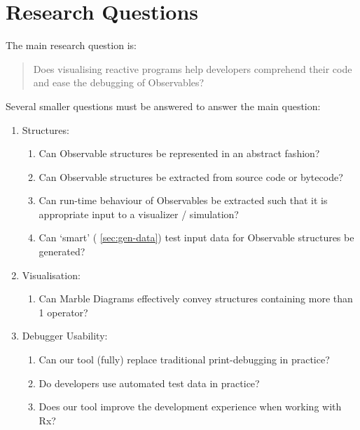 \section{Research Questions}%
\label{sec:questions} The main research question is:

\begin{quotation}
    \noindent
    Does visualising reactive programs help developers comprehend their
    code and ease the debugging of Observables?
\end{quotation}

\noindent
Several smaller questions must be answered to answer the main question:

\begin{enumerate}
    \item
        Structures:
        \begin{enumerate}
            \item
                Can Observable structures be represented in an abstract
                fashion?
            \item
                Can Observable structures be extracted from source code
                or bytecode?
            \item
                Can run-time behaviour of Observables be extracted such
                that it is appropriate input to a visualizer /
                simulation?
            \item
                Can `smart' (%
                \ref{sec:gen-data}) test input data for Observable
                structures be generated?
        \end{enumerate}

    \item
        Visualisation:
        \begin{enumerate}
            \item
                \label{qstn:marble} Can Marble Diagrams effectively
                convey structures containing more than 1 operator?
        \end{enumerate}

    \item
        Debugger Usability:
        \begin{enumerate}
            \item
                \label{qstn:println} Can our tool (fully) replace
                traditional print-debugging in practice?
            \item
                \label{qstn:autogen} Do developers use automated test
                data in practice?
            \item
                \label{qstn:experience} Does our tool improve the
                development experience when working with Rx?
        \end{enumerate}

\end{enumerate}

